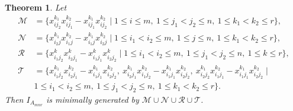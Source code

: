 \documentclass[12pt]{amsart}
\numberwithin{equation}{section}
\newtheorem{theorem}{Theorem}[section]
\theoremstyle{definition}
\begin{document}
\begin{theorem}
\label{thm: mingens}
 Let 
 \begin{align*}
   \mathcal M&=\{x_{ij_2}^{k_1}x_{ij_1}^{k_2}-x_{ij_1}^{k_1}x_{ij_2}^{k_2}\mid 1\le i\le m, \ 1\le j_1<j_2\le n, \ 1\le k_1<k_2\le r\},\\[1ex]
   \mathcal N&=\{x_{i_2j}^{k_1}x_{i_1j}^{k_2}-x_{i_1j}^{k_1}x_{i_2j}^{k_2}\mid 1\le i_1< i_2\le m, \  1\le j\le n, \ 1\le k_1<k_2\le r\},\\[1ex]
   \mathcal R&=\{x_{i_1j_2}^{k}x_{i_2j_1}^{k}-x_{i_1j_1}^{k}x_{i_2j_2}^{k}\mid 1\le i_1< i_2\le m, \  1\le j_1<j_2\le n, \ 1\le k\le r\},\\[1ex] 
   \mathcal T&=\{x_{i_1j_2}^{k_1}x_{i_2j_1}^{k_2}-x_{i_1j_1}^{k_1}x_{i_2j_2}^{k_2}, \ x_{i_2j_1}^{k_1}x_{i_1j_2}^{k_2}-x_{i_1j_1}^{k_1}x_{i_2j_2}^{k_2},\ x_{i_2j_2}^{k_1}x_{i_1j_1}^{k_2}-x_{i_1j_1}^{k_1}x_{i_2j_2}^{k_2}\mid \\& 1\le i_1< i_2\le m, \ 1\le j_1<j_2\le n, \ 1\le k_1<k_2\le r\}.
    \end{align*}
Then $I_{A_{mnr}}$ is minimally generated by $\mathcal M\cup \mathcal N\cup\mathcal R\cup\mathcal T$. 
\end{theorem}
\end{document}
